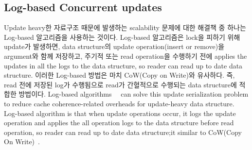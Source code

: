 \subsection{Log-based Concurrent updates}


\ifkor
Update heavy한 자료구조 때문에 발생하는 scalability 문제에 대한 해결책 중 하나는 Log-based 알고리즘을 사용하는
것이다.
Log-based 알고리즘은 lock을 피하기 위해 update가 발생하면, data structure의 update
operation(insert or remove)을 argument와 함께 저장하고, 주기적 또는 read operation을 수행하기 전에
applies the updates in all the logs to the data structure, so reader can read up to date data structure.
이러한 Log-based 방법은 마치 CoW(Copy on Write)와 유사하다.
즉, read 전에 저장된 log가 수행됨으로 read가 간혈적으로 수행되는 data structure에 적합한 방법이다.
\else
Log-based algorithms~\cite{Hendler2010FC}~\cite{SilasBoydWickizerPth} can solve
this update serialization problem to reduce cache coherence-related overheads
for update-heavy data structure.
Log-based algorithm is that when update operations occur, it logs the update
operation and applies the all operation logs to the data structure
before read operation, so reader can read up to date data structure;it similar
to CoW(Copy On Write)~\cite{PaulDetailLWN}.


\fi

